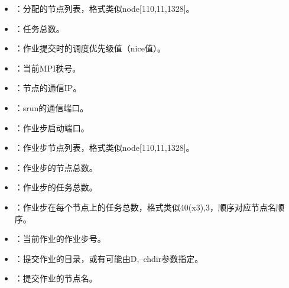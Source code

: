 \documentclass[a4paper,12pt,english]{sphinxmanual}
\begin{document}
\begin{itemize}
\item {} 
\sphinxAtStartPar
{}：分配的节点列表，格式类似node{[}1\sphinxhyphen{}10,11,13\sphinxhyphen{}28{]}。

\item {} 
\sphinxAtStartPar
{}：任务总数。

\item {} 
\sphinxAtStartPar
{}：作业提交时的调度优先级值（nice值）。

\item {} 
\sphinxAtStartPar
{}：当前MPI秩号。

\item {} 
\sphinxAtStartPar
{}：节点的通信IP。

\item {} 
\sphinxAtStartPar
{}：srun的通信端口。

\item {} 
\sphinxAtStartPar
{}：作业步启动端口。

\item {} 
\sphinxAtStartPar
{}：作业步节点列表，格式类似node{[}1\sphinxhyphen{}10,11,13\sphinxhyphen{}28{]}。

\item {} 
\sphinxAtStartPar
{}：作业步的节点总数。

\item {} 
\sphinxAtStartPar
{}：作业步的任务总数。

\item {} 
\sphinxAtStartPar
{}：作业步在每个节点上的任务总数，格式类似40(x3),3，顺序对应节点名顺序。

\item {} 
\sphinxAtStartPar
{}：当前作业的作业步号。

\item {} 
\sphinxAtStartPar
{}：提交作业的目录，或有可能由\sphinxhyphen{}D,–chdir参数指定。

\item {} 
\sphinxAtStartPar
{}：提交作业的节点名。


\end{itemize}
\end{document}
